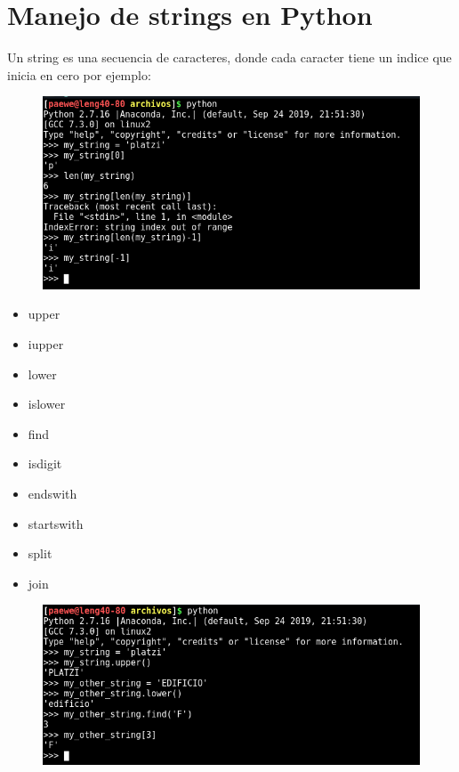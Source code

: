 \documentclass{article}
\begin{document}
\section{Manejo de strings en Python}%
Un string es una secuencia de caracteres, donde cada caracter tiene un indice
que inicia en cero por ejemplo:


\begin{figure}[h!]
  \centering
  \includegraphics[scale=0.75]{./Pictures/004_index_string_len.png}
\end{figure}

\begin{itemize}
  \item upper
  \item iupper
  \item lower
  \item islower
  \item find
  \item isdigit
  \item endswith
  \item startswith
  \item split
  \item join
\end{itemize}

\begin{figure}[h!]
  \centering
  \includegraphics[scale=0.75]{./Pictures/005_methods_string.png}
\end{figure}
\end{document}
